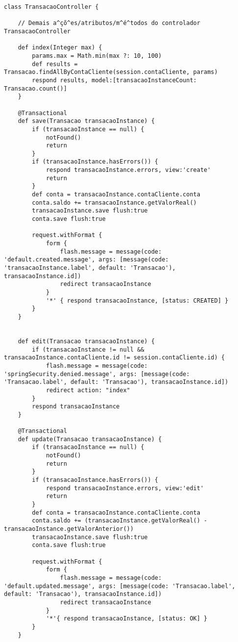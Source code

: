 \begin{lstlisting}[caption=Controlador  {\bf  TransacaoController},  frame=trBL,
    float=htbp, label=codTransacaoController3] 
class TransacaoController {

    // Demais a^çõ^es/atributos/m^é^todos do controlador TransacaoController

    def index(Integer max) {
        params.max = Math.min(max ?: 10, 100)
        def results = Transacao.findAllByContaCliente(session.contaCliente, params)
        respond results, model:[transacaoInstanceCount: Transacao.count()]
    }

    @Transactional
    def save(Transacao transacaoInstance) {
        if (transacaoInstance == null) {
            notFound()
            return
        }
        if (transacaoInstance.hasErrors()) {
            respond transacaoInstance.errors, view:'create'
            return
        }
        def conta = transacaoInstance.contaCliente.conta        
        conta.saldo += transacaoInstance.getValorReal()
        transacaoInstance.save flush:true
        conta.save flush:true

        request.withFormat {
            form {
                flash.message = message(code: 'default.created.message', args: [message(code: 'transacaoInstance.label', default: 'Transacao'), transacaoInstance.id])
                redirect transacaoInstance
            }
            '*' { respond transacaoInstance, [status: CREATED] }
        }
    }


    def edit(Transacao transacaoInstance) {                
        if (transacaoInstance != null && transacaoInstance.contaCliente.id != session.contaCliente.id) {
            flash.message = message(code: 'springSecurity.denied.message', args: [message(code: 'Transacao.label', default: 'Transacao'), transacaoInstance.id])
            redirect action: "index"
        }
        respond transacaoInstance
    }

    @Transactional
    def update(Transacao transacaoInstance) {
        if (transacaoInstance == null) {
            notFound()
            return
        }
        if (transacaoInstance.hasErrors()) {
            respond transacaoInstance.errors, view:'edit'
            return
        }
        def conta = transacaoInstance.contaCliente.conta        
        conta.saldo += (transacaoInstance.getValorReal() - transacaoInstance.getValorAnterior())
        transacaoInstance.save flush:true
        conta.save flush:true
        
        request.withFormat {
            form {
                flash.message = message(code: 'default.updated.message', args: [message(code: 'Transacao.label', default: 'Transacao'), transacaoInstance.id])
                redirect transacaoInstance
            }
            '*'{ respond transacaoInstance, [status: OK] }
        }
    }


\end{lstlisting}
